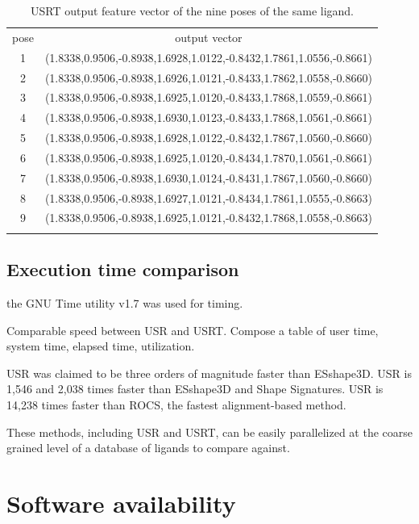 \documentclass[twocolumn]{svjour3}          %
\begin{document}
\begin{table}
\caption{USRT output feature vector of the nine poses of the same ligand.}
\label{tab:T27output}
\begin{tabular}{cc}
\hline\noalign{\smallskip}
pose & output vector\\
\noalign{\smallskip}\hline\noalign{\smallskip}
1 & (1.8338,0.9506,-0.8938,1.6928,1.0122,-0.8432,1.7861,1.0556,-0.8661)\\
2 & (1.8338,0.9506,-0.8938,1.6926,1.0121,-0.8433,1.7862,1.0558,-0.8660)\\
3 & (1.8338,0.9506,-0.8938,1.6925,1.0120,-0.8433,1.7868,1.0559,-0.8661)\\
4 & (1.8338,0.9506,-0.8938,1.6930,1.0123,-0.8433,1.7868,1.0561,-0.8661)\\
5 & (1.8338,0.9506,-0.8938,1.6928,1.0122,-0.8432,1.7867,1.0560,-0.8660)\\
6 & (1.8338,0.9506,-0.8938,1.6925,1.0120,-0.8434,1.7870,1.0561,-0.8661)\\
7 & (1.8338,0.9506,-0.8938,1.6930,1.0124,-0.8431,1.7867,1.0560,-0.8660)\\
8 & (1.8338,0.9506,-0.8938,1.6927,1.0121,-0.8434,1.7861,1.0555,-0.8663)\\
9 & (1.8338,0.9506,-0.8938,1.6925,1.0121,-0.8432,1.7868,1.0558,-0.8663)\\
\noalign{\smallskip}\hline
\end{tabular}
\end{table}

\subsection{Execution time comparison}

the GNU Time utility v1.7 was used for timing.

Comparable speed between USR and USRT. Compose a table of user time, system time, elapsed time, utilization.

USR was claimed to be three orders of magnitude faster than ESshape3D. USR is 1,546 and 2,038 times faster than ESshape3D and Shape Signatures. USR is 14,238 times faster than ROCS, the fastest alignment-based method.

These methods, including USR and USRT, can be easily parallelized at the coarse grained level of a database of ligands to compare against.

\section{Software availability}
\end{document}
